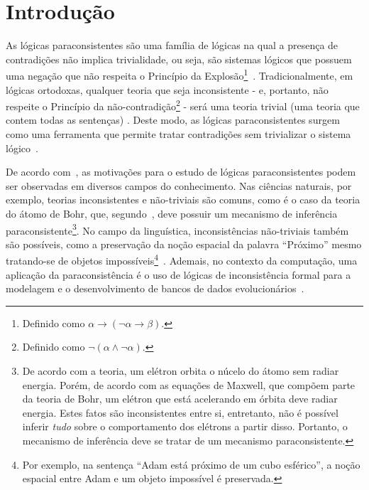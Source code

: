 \chapter{Introdução}
\label{cap:Introducao}


As lógicas paraconsistentes são uma família de lógicas na qual a presença de contradições não implica trivialidade, ou seja, são sistemas lógicos que possuem uma negação que não respeita o Princípio da Explosão\footnote{Definido como $\alpha \rightarrow (\neg \alpha \rightarrow \beta)$.}~\cite{carnielli2007}. Tradicionalmente, em lógicas ortodoxas, qualquer teoria que seja inconsistente {-} e, portanto, não respeite o Princípio da não-contradição\footnote{Definido como $\neg (\alpha \land \neg \alpha)$.} {-} será uma teoria trivial (uma teoria que contem todas as sentenças) . Deste modo, as lógicas paraconsistentes surgem como uma ferramenta que permite tratar contradições sem trivializar o sistema lógico~\cite{Carnielli_Coniglio_2016}.

De acordo com~, as motivações para o estudo de lógicas paraconsistentes podem ser observadas em diversos campos do conhecimento. Nas ciências naturais, por exemplo, teorias inconsistentes e não-triviais são comuns, como é o caso da teoria do átomo de Bohr, que, segundo~, deve possuir um mecanismo de inferência paraconsistente\footnote{De acordo com a teoria, um elétron orbita o núcelo do átomo sem radiar energia. Porém, de acordo com as equações de Maxwell, que compõem parte da teoria de Bohr, um elétron que está acelerando em órbita deve radiar energia. Estes fatos são inconsistentes entre si, entretanto, não é possível inferir \textit{tudo} sobre o comportamento dos elétrons a partir disso. Portanto, o mecanismo de inferência deve se tratar de um mecanismo paraconsistente.}. No campo da linguística, inconsistências não-triviais também são possíveis, como a preservação da noção espacial da palavra ``Próximo'' mesmo tratando-se de objetos impossíveis\footnote{Por exemplo, na sentença ``Adam está próximo de um cubo esférico'', a noção espacial entre Adam e um objeto impossível é preservada.}~\cite{McGinnis2013-MCGTUA}. Ademais, no contexto da computação, uma aplicação da paraconsistência é o uso de lógicas de inconsistência formal para a modelagem e o desenvolvimento de bancos de dados evolucionários~\cite{carnielli2000formal}.


